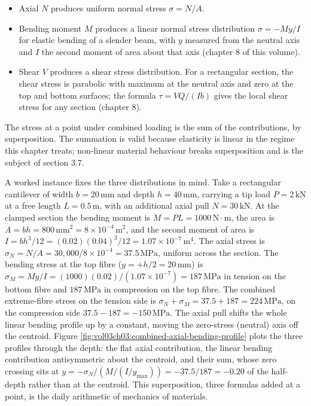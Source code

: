\begin{itemize}[leftmargin=*]
  \item Axial $N$ produces uniform normal stress $\sigma = N/A$.
  \item Bending moment $M$ produces a linear normal stress
    distribution $\sigma = -M y / I$ for elastic bending of a slender
    beam, with $y$ measured from the neutral axis and $I$ the second
    moment of area about that axis (chapter 8 of this volume).
  \item Shear $V$ produces a shear stress distribution. For a
    rectangular section, the shear stress is parabolic with maximum
    at the neutral axis and zero at the top and bottom surfaces; the
    formula $\tau = VQ / (Ib)$ gives the local shear stress for any
    section (chapter 8).
\end{itemize}



The stress at a point under combined loading is the sum of the
contributions, by superposition. The summation is valid because
elasticity is linear in the regime this chapter treats; non-linear
material behaviour breaks superposition and is the subject of section
3.7.

A worked instance fixes the three distributions in mind. Take a
rectangular cantilever of width $b = 20\,\si{\milli\meter}$ and depth
$h = 40\,\si{\milli\meter}$, carrying a tip load $P = 2\,\text{kN}$ at
a free length $L = 0.5\,\si{\meter}$, with an additional axial pull
$N = 30\,\text{kN}$. At the clamped section the bending moment is
$M = PL = 1000\,\text{N}\cdot\text{m}$, the area is $A = bh = 800\,
\si{\milli\meter}^2 = 8\times 10^{-4}\,\si{\meter}^2$, and the second
moment of area is $I = bh^3/12 = (0.02)(0.04)^3/12 = 1.07\times
10^{-7}\,\si{\meter}^4$. The axial stress is $\sigma_N = N/A =
30{,}000/8\times 10^{-4} = 37.5\,\text{MPa}$, uniform across the
section. The bending stress at the top fibre ($y = +h/2 = 20\,\si{
\milli\meter}$) is $\sigma_M = M y / I = (1000)(0.02)/(1.07\times
10^{-7}) = 187\,\text{MPa}$ in tension on the bottom fibre and
$187\,\text{MPa}$ in compression on the top fibre. The combined
extreme-fibre stress on the tension side is $\sigma_N + \sigma_M =
37.5 + 187 = 224\,\text{MPa}$, on the compression side $37.5 - 187 =
-150\,\text{MPa}$. The axial pull shifts the whole linear bending
profile up by a constant, moving the zero-stress (neutral) axis off
the centroid. Figure \ref{fig:vol03ch03:combined-axial-bending-profile}
plots the three profiles through the depth: the flat axial contribution,
the linear bending contribution antisymmetric about the centroid, and
their sum, whose zero crossing sits at $y = -\sigma_N/(M/(I/y_{\max})) =
-37.5/187 = -0.20$ of the half-depth rather than at the centroid. This
superposition, three formulas added at a point, is
the daily arithmetic of mechanics of materials.

